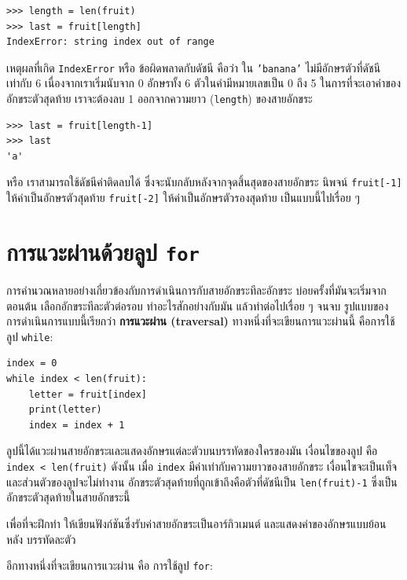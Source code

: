 \begin{verbatim}
>>> length = len(fruit)
>>> last = fruit[length]
IndexError: string index out of range
\end{verbatim}
%
เหตุผลที่เกิด {\tt IndexError} หรือ ข้อผิดพลาดกับดัชนี คือว่า ใน {\tt 'banana'} ไม่มีอักษรตัวที่ดัชนีเท่ากับ 6 
เนื่องจากเราเริ่มนับจาก 0  อักษรทั้ง 6 ตัวในคำมีหมายเลขเป็น 0 ถึง 5 ในการที่จะเอาค่าของอักขระตัวสุดท้าย เราจะต้องลบ 1 
ออกจากความยาว ({\tt length}) ของสายอักขระ
\begin{verbatim}
>>> last = fruit[length-1]
>>> last
'a'
\end{verbatim}
%
หรือ เราสามารถใช้ดัชนีค่าติดลบได้ ซึ่งจะนับกลับหลังจากจุดสิ้นสุดของสายอักขระ นิพจน์ {\tt fruit[-1]} 
ให้ค่าเป็นอักษรตัวสุดท้าย {\tt fruit[-2]} ให้ค่าเป็นอักษรตัวรองสุดท้าย เป็นแบบนี้ไปเรื่อย ๆ



\section{การแวะผ่านด้วยลูป {\tt for}} %
\label{for}

การคำนวณหลายอย่างเกี่ยวข้องกับการดำเนินการกับสายอักขระทีละอักขระ บ่อยครั้งที่มันจะเริ่มจากตอนต้น
เลือกอักขระทีละตัวต่อรอบ ทำอะไรสักอย่างกับมัน แล้วทำต่อไปเรื่อย ๆ จนจบ รูปแบบของ
การดำเนินการแบบนี้เรียกว่า {\bf การแวะผ่าน (traversal)} ทางหนึ่งที่จะเขียนการแวะผ่านนี้
คือการใช้ลูป {\tt while}:

\begin{verbatim}
index = 0
while index < len(fruit):
    letter = fruit[index]
    print(letter)
    index = index + 1
\end{verbatim}
%
ลูปนี้ได้แวะผ่านสายอักขระและแสดงอักษรแต่ละตัวบนบรรทัดของใครของมัน เงื่อนไขของลูป คือ 
{\tt index < len(fruit)}  ดังนั้น เมื่อ {\tt index} มีค่าเท่ากับความยาวของสายอักขระ
เงื่อนไขจะเป็นเท็จ และส่วนตัวของลูปจะไม่ทำงาน อักขระตัวสุดท้ายที่ถูกเข้าถึงคือตัวที่ดัชนีเป็น 
{\tt len(fruit)-1} ซึ่งเป็นอักขระตัวสุดท้ายในสายอักขระนี้

เพื่อที่จะฝึกทำ ให้เขียนฟังก์ชันซึ่งรับค่าสายอักขระเป็นอาร์กิวเมนต์ และแสดงค่าของอักษรแบบย้อนหลัง 
บรรทัดละตัว

อีกทางหนึ่งที่จะเขียนการแวะผ่าน คือ การใช้ลูป {\tt for}:

